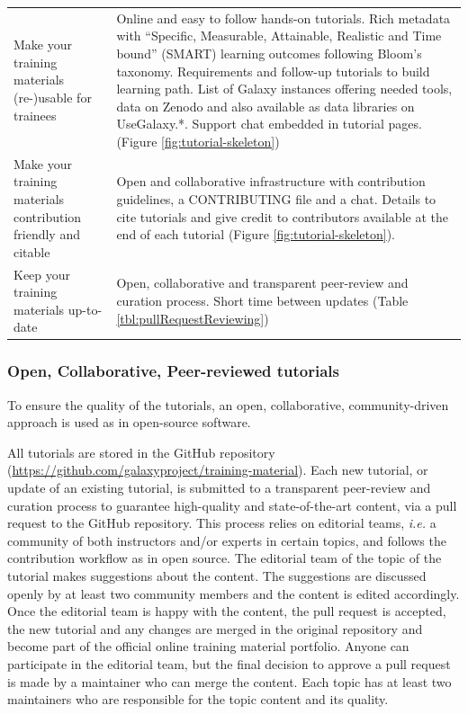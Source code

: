 \documentclass[10pt,letterpaper]{article}
\begin{document}
\begin{table}[h!]
\begin{tabular}{p{}p{}}
		Make your training materials (re-)usable for trainees                          & Online and easy to follow hands-on tutorials. Rich metadata with ``Specific, Measurable, Attainable, Realistic and Time bound'' (SMART) learning outcomes following Bloom's taxonomy. Requirements and follow-up tutorials to build learning path. List of Galaxy instances offering needed tools, data on Zenodo and also available as data libraries on UseGalaxy.*. Support chat embedded in tutorial pages. (Figure \ref{fig:tutorial-skeleton})\\
		Make your training materials contribution friendly and citable                & Open and collaborative infrastructure with contribution guidelines, a CONTRIBUTING file and a chat. Details to cite tutorials and give credit to contributors available at the end of each tutorial (Figure \ref{fig:tutorial-skeleton}).\\
		Keep your training materials up-to-date                                       & Open, collaborative and transparent peer-review and curation process. Short time between updates (Table \ref{tbl:pullRequestReviewing})\\
	\end{tabular}
\end{table}


\subsubsection*{Open, Collaborative, Peer-reviewed tutorials}

To ensure the quality of the tutorials, an open, collaborative, community-driven approach is used as in open-source software. 

All tutorials are stored in the GitHub repository (\url{https://github.com/galaxyproject/training-material}). Each new tutorial, or update of an existing tutorial, is submitted to a transparent peer-review and curation process to guarantee high-quality and state-of-the-art content, via a pull request to the GitHub repository. This process relies on editorial teams, \textit{i.e.} a community of both instructors and/or experts in certain topics, and follows the contribution workflow as in open source. The editorial team of the topic of the tutorial makes suggestions about the content. The suggestions are discussed openly by at least two community members and the content is edited accordingly. Once the editorial team is happy with the content, the pull request is accepted, the new tutorial and any changes are merged in the original repository and become part of the official online training material portfolio. Anyone can participate in the editorial team, but the final decision to approve a pull request is made by a maintainer who can merge the content. Each topic has at least two maintainers who are responsible for the topic content and its quality.
\end{document}
